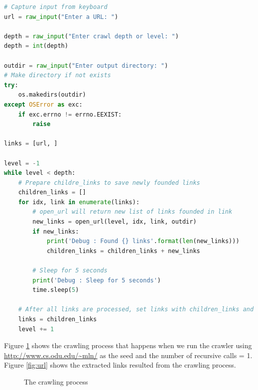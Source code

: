 \documentclass[letterpaper,11pt]{article}
\begin{document}
\begin{lstlisting}[language=python, caption={Simple single-threaded web crawler}, label={lst:web-crawler}]
# Capture input from keyboard
url = raw_input("Enter a URL: ")

depth = raw_input("Enter crawl depth or level: ")
depth = int(depth)

outdir = raw_input("Enter output directory: ")
# Make directory if not exists
try:
    os.makedirs(outdir)
except OSError as exc:
    if exc.errno != errno.EEXIST:
        raise

links = [url, ]

level = -1
while level < depth:
    # Prepare childre_links to save newly founded links
    children_links = []
    for idx, link in enumerate(links):
        # open_url will return new list of links founded in link
        new_links = open_url(level, idx, link, outdir)
        if new_links:
            print('Debug : Found {} links'.format(len(new_links)))
            children_links = children_links + new_links

        # Sleep for 5 seconds
        print('Debug : Sleep for 5 seconds')
        time.sleep(5)

    # After all links are processed, set links with children_links and increase level
    links = children_links
    level += 1


\end{lstlisting}

Figure \ref{fig:crawler} shows the crawling process that happens when we run the crawler using  \url{http://www.cs.odu.edu/~mln/} as the seed and the number of recursive calls = 1. Figure \ref{fig:url} shows the extracted links resulted from the crawling process. 


\begin{figure}[H]


\centering

\caption{The crawling process}

\label{fig:crawler}

\end{figure} 
\end{document}
